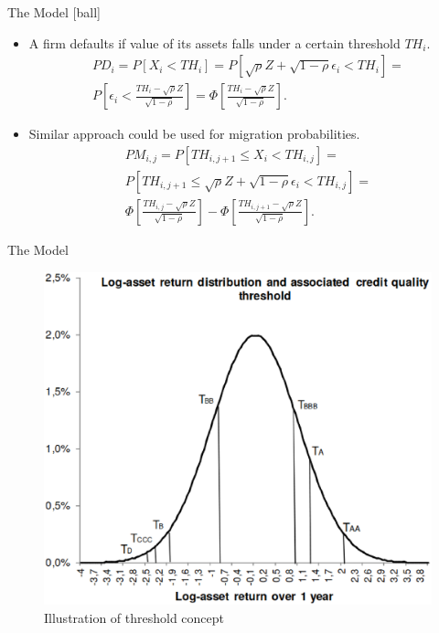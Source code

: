 \documentclass{beamer}
\begin{document}
\begin{frame}{The Model}
[ball]
\begin{itemize}
	\item A firm defaults if value of its assets falls under a certain threshold $TH_i$.
		\begin{multline}
			PD_i = P[X_i < TH_i] = P[\sqrt{\rho}Z + \sqrt{1 - \rho} 
			\epsilon_i < TH_i]=\\
			P\left[\epsilon_i < \frac{TH_i - \sqrt{\rho}Z}{\sqrt{1 - 
			\rho}}\right] = \Phi\left[\frac{TH_i - \sqrt{\rho}Z}{\sqrt{1 - 
			\rho}}\right].
		\end{multline}
	\item Similar approach could be used for migration probabilities.
		\begin{multline}
			PM_{i,j} = P[TH_{i, j + 1} \le X_i < TH_{i, j}] =\\
			P[TH_{i, j + 1} \le \sqrt{\rho}Z + \sqrt{1 - \rho} \epsilon_i < TH_{i, j}]=\\
			\Phi\left[\frac{TH_{i, j} - \sqrt{\rho}Z}{\sqrt{1 - 
			\rho}}\right] - \Phi\left[\frac{TH_{i, j + 1} - \sqrt{\rho}Z}{\sqrt{1 - 
			\rho}}\right].
		\end{multline}
\end{itemize}
\end{frame}

\begin{frame}{The Model}
\begin{figure}[htp]
\centering
\includegraphics[scale = 0.25]{pictures/thresholds.eps}
\caption{Illustration of threshold concept}
\label{thresholds}
\end{figure}
\end{frame}
\end{document}
